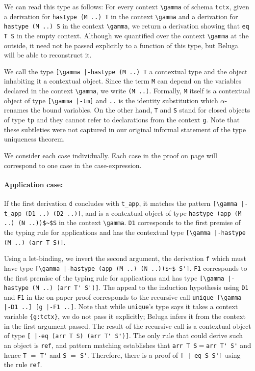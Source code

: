 We can read this type as follows: For every context \lstinline!\gamma! of
schema \lstinline!tctx!, given a derivation for
\lstinline!hastype (M ..) T! in the context \lstinline!\gamma! and a derivation for
\lstinline!hastype (M ..) S! in the context \lstinline!\gamma!, we return a
derivation showing that \lstinline!eq T S! in the empty context.
Although we quantified over the context \lstinline!\gamma! at the outside,
it need not be passed explicitly to a function of this type, but
Beluga will be able to reconstruct it.

We call the type \lstinline![\gamma |-hastype (M ..) T! a contextual type and
the object inhabiting it a contextual object.
Since the term \lstinline!M! can depend on the variables declared in the
context \lstinline!\gamma!, we  write  \lstinline!(M ..)!. Formally,
\lstinline!M! itself is a contextual object of type
\lstinline![\gamma |-tm]! and \lstinline!..! is the identity substitution
which $\alpha$-renames the bound variables.
On the other hand, \lstinline!T! and \lstinline!S! stand for closed
objects of type \lstinline!tp! and they cannot refer to declarations
from the context \lstinline!g!. Note that these subtleties were not
captured in our original informal statement of the type uniqueness
theorem.

We consider each case individually. Each case in the proof on page
\pageref{sec:thmunique} will correspond to one case in the
case-expression.
%
\paragraph{Application case:} If the first derivation \lstinline{d} concludes
with \lstinline{t_app}, it matches
the pattern \lstinline![\gamma |-t_app (D1 ..) (D2 ..)]!, and is
a contextual object of type
\lstinline!hastype (app (M ..) (N ..))$~$S! in the context \lstinline!\gamma!.  %
\lstinline!D1! corresponds to the first
premise of the typing rule for applications and has the contextual type
\lstinline![\gamma |-hastype (M ..) (arr T S)]!.

Using a let-binding, we invert the second
argument, the derivation \lstinline{f} which
must have type
\lstinline![\gamma |-hastype (app (M ..) (N ..))$~$ S']!. \lstinline!F1!
corresponds to the first premise of the typing rule for applications
and has type \lstinline![\gamma |-hastype (M ..) (arr T' S')]!.
The appeal to the induction hypothesis using \lstinline{D1} and \lstinline{F1} in the
on-paper proof
corresponds to the recursive call
 \lstinline!unique [\gamma |-D1 ..] [g |-F1 ..]!.
Note that while \lstinline!unique!'s type says it takes a context variable \lstinline!{g:tctx}!,
we do not pass it explicitly; Beluga infers it from the context in the first argument
passed.
The result of the recursive call is a contextual object of type
\lstinline![ |-eq (arr T S) (arr T' S')]!. The only rule that
could derive such an object is \lstinline{ref}, and pattern matching
establishes that \lstinline!arr T S!$=$\lstinline!arr T' S'! and hence
\lstinline!T! $=$ \lstinline!T'! and \lstinline!S! $=$ \lstinline!S'!.
Therefore, there is a proof of \lstinline![ |-eq S S']! using the
rule \lstinline!ref!.

